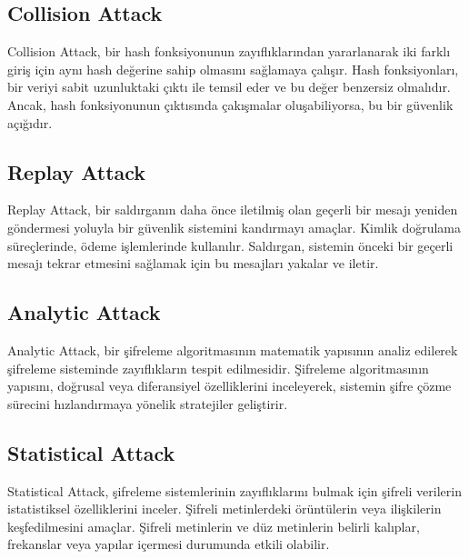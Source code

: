 \newpage

\subsection{Collision Attack}

Collision Attack, bir hash fonksiyonunun zayıflıklarından yararlanarak iki farklı giriş için aynı hash değerine sahip olmasını sağlamaya çalışır. Hash fonksiyonları, bir veriyi sabit uzunluktaki çıktı ile temsil eder ve bu değer benzersiz olmalıdır. Ancak, hash fonksiyonunun çıktısında çakışmalar oluşabiliyorsa, bu bir güvenlik açığıdır. 

\newpage

\subsection{Replay Attack}

Replay Attack, bir saldırganın daha önce iletilmiş olan geçerli bir mesajı yeniden göndermesi yoluyla bir güvenlik sistemini kandırmayı amaçlar. Kimlik doğrulama süreçlerinde, ödeme işlemlerinde kullanılır. Saldırgan, sistemin önceki bir geçerli mesajı tekrar etmesini sağlamak için bu mesajları yakalar ve iletir.

\newpage

\subsection{Analytic Attack}

Analytic Attack, bir şifreleme algoritmasının matematik yapısının analiz edilerek şifreleme sisteminde zayıflıkların tespit edilmesidir. Şifreleme algoritmasının yapısını, doğrusal veya diferansiyel özelliklerini inceleyerek, sistemin şifre çözme sürecini hızlandırmaya yönelik stratejiler geliştirir.

\newpage

\subsection{Statistical Attack}

Statistical Attack, şifreleme sistemlerinin zayıflıklarını bulmak için şifreli verilerin istatistiksel özelliklerini inceler. Şifreli metinlerdeki örüntülerin veya ilişkilerin keşfedilmesini amaçlar. Şifreli metinlerin ve düz metinlerin belirli kalıplar, frekanslar veya yapılar içermesi durumunda etkili olabilir. 

\newpage
